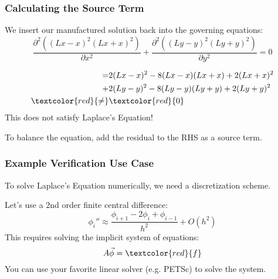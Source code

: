 \documentclass[mathserif]{beamer}
\begin{document}

\begin{frame}
  \frametitle{Calculating the Source Term}

  We insert our manufactured solution back into the governing equations:
  \begin{equation}
      \nonumber
    \frac{\partial^2 ((Lx-x)^2 (Lx+x)^2)}{\partial x^2} + \frac{\partial^2 ((Ly-y)^2 (Ly+y)^2)}{\partial y^2} = 0
  \end{equation}

  \begin{equation}
    \begin{split}
      \nonumber      
      = & 2(Lx-x)^2 - 8(Lx-x)(Lx+x)+2(Lx+x)^2 \\
      + & 2(Ly-y)^2 - 8(Ly-y)(Ly+y)+2(Ly+y)^2 \\
      \textcolor{red}{\neq} & \textcolor{red}{0}
    \end{split}
  \end{equation}
  This does not satisfy Laplace's Equation!
  \newline
  \newline
  \begin{block}{}
    To balance the equation, add the residual to the RHS as a source term. 
  \end{block}
\end{frame}

\begin{frame}
  \frametitle{Example Verification Use Case}
  \begin{block}{}
    To solve Laplace's Equation numerically, we need a discretization scheme.
  \end{block}
  Let's use a 2nd order finite central difference:
  \begin{equation}
      \nonumber      
    \phi_i'' \approx \frac{\phi_{i+1} - 2\phi_{i} + \phi_{i-1}}{h^2} + O(h^2)
  \end{equation}
  This requires solving the implicit system of equations: 
  \begin{equation}
      \nonumber      
      A \vec \phi = \textcolor{red}{f}
  \end{equation}
   You can use your favorite linear solver (e.g. PETSc) to solve the
   system.

\end{frame}
\end{document}
